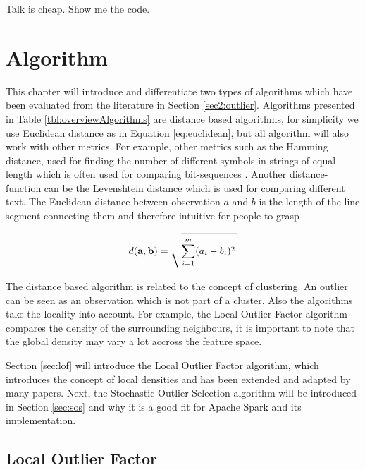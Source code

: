 \begin{savequote}[75mm] 
Talk is cheap. Show me the code.  
\end{savequote}

\chapter{Algorithm \label{chap4:algorithm}}

This chapter will introduce and differentiate two types of algorithms which have been evaluated from the literature in Section \ref{sec2:outlier}. Algorithms presented in Table \ref{tbl:overviewAlgorithms} are distance based algorithms, for simplicity we use Euclidean distance as in Equation \ref{eq:euclidean}, but all algorithm will also work with other metrics. For example, other metrics such as the Hamming distance, used for finding the number of different symbols in strings of equal length which is often used for comparing bit-sequences \cite{citeulike:1667687}. Another distance-function can be the Levenshtein distance which is used for comparing different text. The Euclidean distance between observation $a$ and $b$ is the length of the line segment connecting them and therefore intuitive for people to grasp \cite{Deza2009EncyclopediaofDistances}.

\begin{equation}
d({\bf a},{\bf b}) = \sqrt{\sum^{m}_{i=1} (a_{i} - b_{i})^2} \label{eq:euclidean}
\end{equation}

The distance based algorithm is related to the concept of clustering. An outlier can be seen as an observation which is not part of a cluster. Also the algorithms take the locality into account. For example, the Local Outlier Factor algorithm compares the density of the surrounding neighbours, it is important to note that the global density may vary a lot accross the feature space.

Section \ref{sec:lof} will introduce the Local Outlier Factor algorithm, which introduces the concept of local densities and has been extended and adapted by many papers. Next, the Stochastic Outlier Selection algorithm will be introduced in Section \ref{sec:sos} and why it is a good fit for Apache Spark and its implementation.

\section{Local Outlier Factor \label{sec:lof}}

